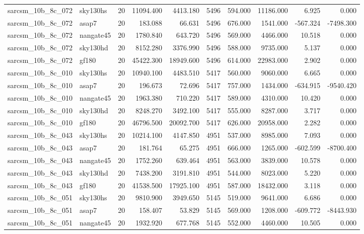 \documentclass{article}
\begin{document}
\begin{longtable}{llrrrrrrrr}
sarcsm\_10b\_8c\_072 & sky130hs & 20 & 11094.400 & 4413.180 & 5496 & 594.000 & 11186.000 & 6.925 & 0.000 \\
sarcsm\_10b\_8c\_072 & asap7 & 20 & 183.088 & 66.631 & 5496 & 676.000 & 1541.000 & -567.324 & -7498.300 \\
sarcsm\_10b\_8c\_072 & nangate45 & 20 & 1780.840 & 643.720 & 5496 & 569.000 & 4466.000 & 10.518 & 0.000 \\
sarcsm\_10b\_8c\_072 & sky130hd & 20 & 8152.280 & 3376.990 & 5496 & 588.000 & 9735.000 & 5.137 & 0.000 \\
sarcsm\_10b\_8c\_072 & gf180 & 20 & 45422.300 & 18949.600 & 5496 & 614.000 & 22983.000 & 2.902 & 0.000 \\
sarcsm\_10b\_8c\_010 & sky130hs & 20 & 10940.100 & 4483.510 & 5417 & 560.000 & 9060.000 & 6.665 & 0.000 \\
sarcsm\_10b\_8c\_010 & asap7 & 20 & 196.673 & 72.696 & 5417 & 757.000 & 1434.000 & -634.915 & -9540.420 \\
sarcsm\_10b\_8c\_010 & nangate45 & 20 & 1963.380 & 710.220 & 5417 & 589.000 & 4310.000 & 10.420 & 0.000 \\
sarcsm\_10b\_8c\_010 & sky130hd & 20 & 8248.270 & 3492.100 & 5417 & 555.000 & 8287.000 & 3.717 & 0.000 \\
sarcsm\_10b\_8c\_010 & gf180 & 20 & 46796.500 & 20092.700 & 5417 & 626.000 & 20958.000 & 2.282 & 0.000 \\
sarcsm\_10b\_8c\_043 & sky130hs & 20 & 10214.100 & 4147.850 & 4951 & 537.000 & 8985.000 & 7.093 & 0.000 \\
sarcsm\_10b\_8c\_043 & asap7 & 20 & 181.764 & 65.275 & 4951 & 666.000 & 1265.000 & -602.599 & -8700.400 \\
sarcsm\_10b\_8c\_043 & nangate45 & 20 & 1752.260 & 639.464 & 4951 & 563.000 & 3839.000 & 10.578 & 0.000 \\
sarcsm\_10b\_8c\_043 & sky130hd & 20 & 7438.200 & 3191.810 & 4951 & 544.000 & 8023.000 & 5.220 & 0.000 \\
sarcsm\_10b\_8c\_043 & gf180 & 20 & 41538.500 & 17925.100 & 4951 & 587.000 & 18432.000 & 3.118 & 0.000 \\
sarcsm\_10b\_8c\_051 & sky130hs & 20 & 9810.900 & 3949.650 & 5145 & 519.000 & 9641.000 & 6.686 & 0.000 \\
sarcsm\_10b\_8c\_051 & asap7 & 20 & 158.407 & 53.829 & 5145 & 569.000 & 1208.000 & -609.772 & -8443.930 \\
sarcsm\_10b\_8c\_051 & nangate45 & 20 & 1932.920 & 677.768 & 5145 & 552.000 & 4460.000 & 10.505 & 0.000 \\

\end{longtable}
\end{document}
